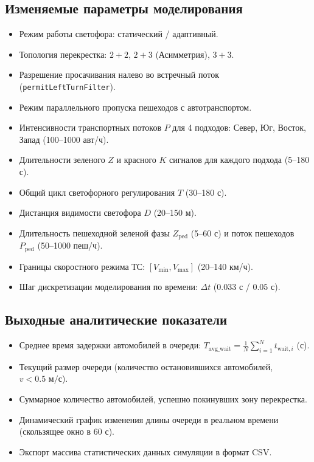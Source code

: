 \documentclass[11pt, a4paper]{article}
\begin{document}
\subsection{Изменяемые параметры моделирования}
\begin{itemize}
  \item Режим работы светофора: статический / адаптивный.
  \item Топология перекрестка: $2+2$, $2+3$ (Асимметрия), $3+3$.
  \item Разрешение просачивания налево во встречный поток (\texttt{permitLeftTurnFilter}).
  \item Режим параллельного пропуска пешеходов с автотранспортом.
  \item Интенсивности транспортных потоков $P$ для 4 подходов: Север, Юг, Восток, Запад (100--1000 авт/ч).
  \item Длительности зеленого $Z$ и красного $K$ сигналов для каждого подхода (5--180 с).
  \item Общий цикл светофорного регулирования $T$ (30--180 с).
  \item Дистанция видимости светофора $D$ (20--150 м).
  \item Длительность пешеходной зеленой фазы $Z_{\text{ped}}$ (5--60 с) и поток пешеходов $P_{\text{ped}}$ (50--1000 пеш/ч).
  \item Границы скоростного режима ТС: $[V_{\min}, V_{\max}]$ (20--140 км/ч).
  \item Шаг дискретизации моделирования по времени: $\Delta t$ ($0.033\text{ с}$ / $0.05\text{ с}$).
\end{itemize}

\subsection{Выходные аналитические показатели}
\begin{itemize}
  \item Среднее время задержки автомобилей в очереди: $T_{\text{avg\_wait}} = \frac{1}{N} \sum_{i=1}^N t_{\text{wait}, i}$ (с).
  \item Текущий размер очереди (количество остановившихся автомобилей, $v < 0.5\text{ м/с}$).
  \item Суммарное количество автомобилей, успешно покинувших зону перекрестка.
  \item Динамический график изменения длины очереди в реальном времени (скользящее окно в 60 с).
  \item Экспорт массива статистических данных симуляции в формат CSV.
\end{itemize}
\end{document}
